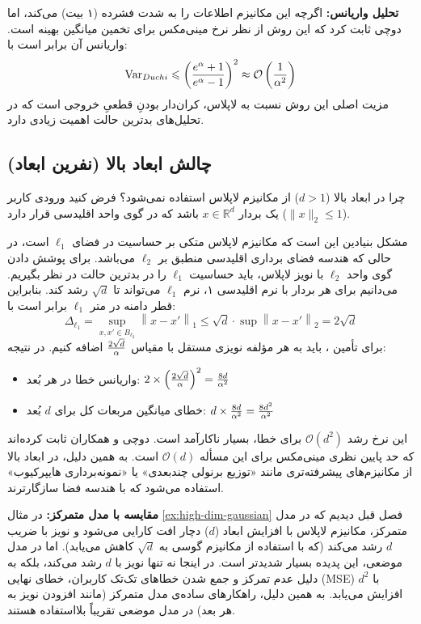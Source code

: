 \textbf{تحلیل واریانس:}
اگرچه این مکانیزم اطلاعات را به شدت فشرده (۱ بیت) می‌کند، اما دوچی ثابت کرد که این روش از نظر نرخ مینی‌مکس برای تخمین میانگین بهینه است. واریانس آن برابر است با:
\begin{equation}
\mathrm{Var}_{Duchi} \leqslant \left( \frac{e^{\alpha}+1}{e^{\alpha}-1} \right)^2 \approx \mathcal{O}\left( \frac{1}{\alpha^2} \right)
\end{equation}
مزیت اصلی این روش نسبت به لاپلاس، کران‌دار بودنِ قطعیِ خروجی است که در تحلیل‌های بدترین حالت اهمیت زیادی دارد.

\subsection*{چالش ابعاد بالا (نفرین ابعاد)}

چرا در ابعاد بالا ($d > 1$) از مکانیزم لاپلاس استفاده نمی‌شود؟
فرض کنید ورودی کاربر یک بردار $x \in \mathbb{R}^d$ باشد که در گوی واحد اقلیدسی قرار دارد ($\|x\|_2 \le 1$).

مشکل بنیادین این است که مکانیزم لاپلاس متکی بر حساسیت در فضای $\ell_1$ است، در حالی که هندسه فضای برداری اقلیدسی منطبق بر $\ell_2$ می‌باشد. برای پوشش دادن گوی واحد $\ell_2$ با نویز لاپلاس، باید حساسیت $\ell_1$ را در بدترین حالت در نظر بگیریم. می‌دانیم برای هر بردار با نرم اقلیدسی ۱، نرم $\ell_1$ می‌تواند تا $\sqrt{d}$ رشد کند. بنابراین قطر دامنه در متر $\ell_1$ برابر است با:
\begin{equation}
\Delta_{\ell_1} = \sup_{x, x' \in B_{\ell_2}} \left\|x - x'\right\|_1 \le \sqrt{d} \cdot \sup \left\|x - x'\right\|_2 = 2\sqrt{d}
\end{equation}
برای تأمین \LDP، باید به هر مؤلفه نویزی مستقل با مقیاس $\frac{2\sqrt{d}}{\alpha}$ اضافه کنیم. در نتیجه:
\begin{itemize}
    \item واریانس خطا در هر بُعد: $2 \times \left(\frac{2\sqrt{d}}{\alpha}\right)^2 = \frac{8d}{\alpha^2}$
    \item خطای میانگین مربعات کل برای $d$ بُعد: $d \times \frac{8d}{\alpha^2} = \frac{8d^2}{\alpha^2}$
\end{itemize}
این نرخ رشد $\mathcal{O}(d^2)$ برای خطا، بسیار ناکارآمد است. دوچی و همکاران \cite{Duchi2013} ثابت کرده‌اند که حد پایین نظری مینی‌مکس برای این مسأله $\mathcal{O}(d)$ است. به همین دلیل، در ابعاد بالا از مکانیزم‌های پیشرفته‌تری مانند «توزیع برنولی چندبعدی» یا «نمونه‌برداری هایپرکیوب» استفاده می‌شود که با هندسه فضا سازگارترند.

\textbf{مقایسه با مدل متمرکز:}
در مثال \ref{ex:high-dim-gaussian} فصل قبل دیدیم که در مدل متمرکز، مکانیزم لاپلاس با افزایش ابعاد ($d$) دچار افت کارایی می‌شود و نویز با ضریب $d$ رشد می‌کند (که با استفاده از مکانیزم گوسی به $\sqrt{d}$ کاهش می‌یابد).
اما در مدل موضعی، این پدیده بسیار شدیدتر است. در اینجا نه تنها نویز با $d$ رشد می‌کند، بلکه به دلیل عدم تمرکز و جمع شدن خطاهای تک‌تک کاربران، خطای نهایی (MSE) با $d^2$ افزایش می‌یابد. به همین دلیل، راهکارهای ساده‌ی مدل متمرکز (مانند افزودن نویز به هر بعد) در مدل موضعی تقریباً بلااستفاده هستند.

